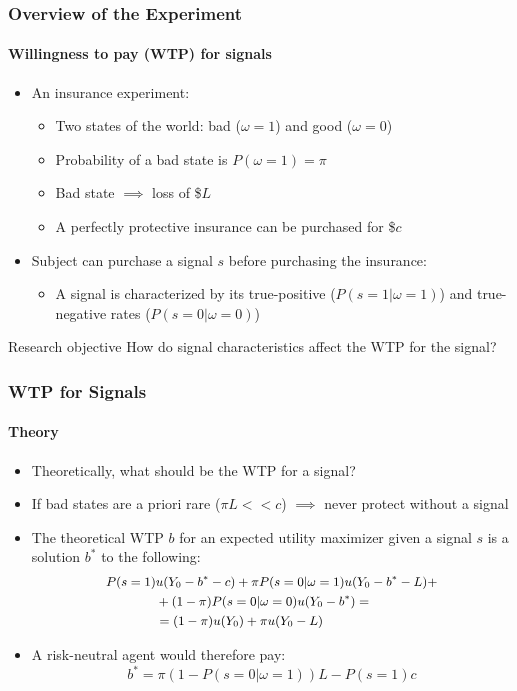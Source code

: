 \documentclass[11pt,hyperref={bookmarks=false}]{beamer}
\begin{document}
\begin{frame}
\frametitle{Overview of the Experiment}
\framesubtitle{Willingness to pay (WTP) for signals}
\begin{itemize}
	\item An insurance experiment:
		\begin{itemize}
			\item Two states of the world: bad ($\omega=1$) and good ($\omega=0$)
			\item Probability of a bad state is $P (\omega=1) = \pi$
			\item Bad state $\implies$ loss of \$$L$
			\item A perfectly protective insurance can be purchased for \$$c$
		\end{itemize}
	\item Subject can purchase a signal $s$ before purchasing the insurance:
		\begin{itemize}
			\item A signal is characterized by its true-positive ($P(s=1|\omega=1)$) and true-negative rates ($P(s=0|\omega=0)$) 
		\end{itemize}
\end{itemize}

\vspace{1em}
\begin{block}{Research objective}
	How do signal characteristics affect the WTP for the signal?
\end{block}
\end{frame}



\begin{frame}
\frametitle{WTP for Signals}
\framesubtitle{Theory}

\begin{itemize}
	\item Theoretically, what should be the WTP for a signal?
	\item If bad states are a priori rare ($\pi L<<c$) $\implies$ never protect without a signal
	\item The theoretical WTP $b$ for an expected utility maximizer given a signal $s$ is a solution $b^*$ to the following:
	\[
	\small
	\begin{split}
		P(s=1) &u(Y_0-b^*-c) + \pi P(s=0|\omega=1)u(Y_0-b^*-L)+\\ 
		&+(1-\pi)P(s=0|\omega=0)u(Y_0-b^*) =\\
		&=(1-\pi)u(Y_0)+\pi u(Y_0-L)
	\end{split}
	\]
	\normalsize
	\item A risk-neutral agent would therefore pay:
		\[b^*=\pi(1-P(s=0|\omega=1))L-P(s=1)c\]
\end{itemize}
\end{frame}
\end{document}
